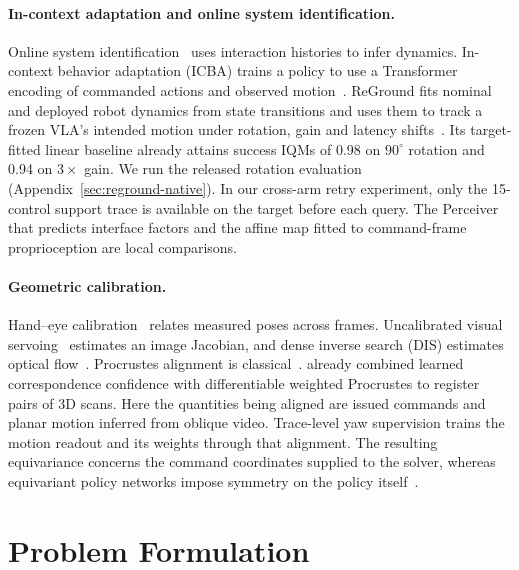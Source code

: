 \documentclass{article}
\theoremstyle{plain}
\theoremstyle{remark}
\begin{document}
\paragraph{In-context adaptation and online system identification.}
Online system identification~\citep{yu2017preparing,kumar2021rma,laskin2023algorithm} uses interaction histories to infer dynamics. In-context behavior adaptation (ICBA) trains a policy to use a Transformer encoding of commanded actions and observed motion~\citep{yang2026icba}. ReGround fits nominal and deployed robot dynamics from state transitions and uses them to track a frozen VLA's intended motion under rotation, gain and latency shifts~\citep{siddique2026reground}. Its target-fitted linear baseline already attains success IQMs of 0.98 on $90^\circ$ rotation and 0.94 on $3\times$ gain. We run the released rotation evaluation (Appendix~\ref{sec:reground-native}). In our cross-arm retry experiment, only the 15-control support trace is available on the target before each query. The Perceiver~\citep{jaegle2022perceiverio} that predicts interface factors and the affine map fitted to command-frame proprioception are local comparisons.

\paragraph{Geometric calibration.}
Hand--eye calibration~\citep{tsai1989handeye,park1994handeye} relates measured poses across frames. Uncalibrated visual servoing~\citep{jagersand1997uvs} estimates an image Jacobian, and dense inverse search (DIS) estimates optical flow~\citep{kroeger2016dis}. Procrustes alignment is classical~\citep{schonemann1966generalized,kabsch1976solution,umeyama1991least}. \citet{choy2020deep} already combined learned correspondence confidence with differentiable weighted Procrustes to register pairs of 3D scans. Here the quantities being aligned are issued commands and planar motion inferred from oblique video. Trace-level yaw supervision trains the motion readout and its weights through that alignment. The resulting equivariance concerns the command coordinates supplied to the solver, whereas equivariant policy networks impose symmetry on the policy itself~\citep{cohen2016group,wang2022equivariant}.

\section{Problem Formulation}
\end{document}
